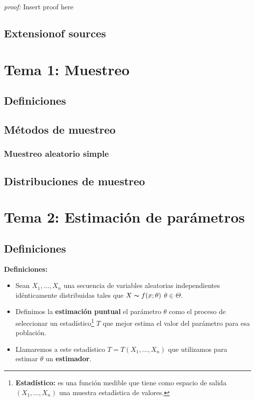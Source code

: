 \documentclass{article}
\begin{document}
 \noindent\textit{proof:}  Insert proof here
 
 
		
 
		\subsection{Extensionof sources}
		


		
\newpage
\section{Tema 1: Muestreo}
	\subsection{Definiciones}
	\subsection{Métodos de muestreo}
		\subsubsection{Muestreo aleatorio simple}
	\subsection{Distribuciones de muestreo}
	

\newpage
\section{Tema 2: Estimación de parámetros}
		\subsection{Definiciones}
		
			\noindent 	\textbf{Definiciones: } 
			\begin{itemize}
			
				\item Sean $X_1, ..., X_n$ una secuencia de variables aleatorias independientes idénticamente distribuidas  tales que $X \thicksim f(x; \theta)$ $\theta \in \Theta$. 		
				\item Definimos la \textbf{estimación puntual} el parámetro $\theta$ como el proceso de seleccionar un estadístico\footnote{\textbf{Estadístico: } es una función medible que tiene como espacio de salida $(X_1, ..., X_n)$ una muestra estadística de valores.} $T$ que mejor estima el valor del parámetro para esa población. 		
				\item Llamaremos a este estadístico $T = T(X_1, ..., X_n)$ que utilizamos para estimar $\theta$ un \textbf{estimador}.		
			\end{itemize}
			
\end{document}
